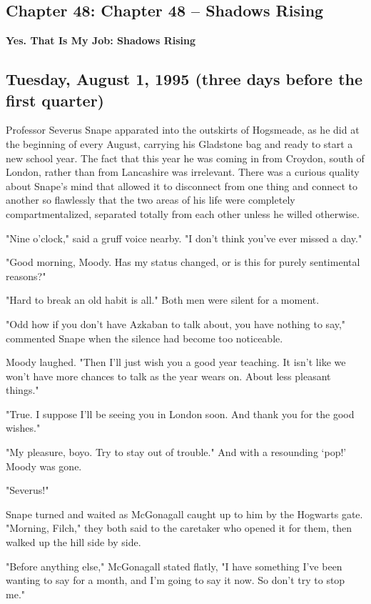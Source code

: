 \documentclass[a4paper,11pt]{article}
\begin{document}
\subsection{Chapter 48: Chapter 48 – Shadows Rising}

\textbf{Yes. That Is My Job: Shadows Rising}

\subsection{Tuesday, August 1, 1995 (three days before the first quarter)}

Professor Severus Snape apparated into the outskirts of Hogsmeade, as he did at the beginning of every August, carrying his Gladstone bag and ready to start a new school year. The fact that this year he was coming in from Croydon, south of London, rather than from Lancashire was irrelevant. There was a curious quality about Snape's mind that allowed it to disconnect from one thing and connect to another so flawlessly that the two areas of his life were completely compartmentalized, separated totally from each other unless he willed otherwise.

"Nine o'clock," said a gruff voice nearby. "I don't think you've ever missed a day."

"Good morning, Moody. Has my status changed, or is this for purely sentimental reasons?"

"Hard to break an old habit is all." Both men were silent for a moment.

"Odd how if you don't have Azkaban to talk about, you have nothing to say," commented Snape when the silence had become too noticeable.

Moody laughed. "Then I'll just wish you a good year teaching. It isn't like we won't have more chances to talk as the year wears on. About less pleasant things."

"True. I suppose I'll be seeing you in London soon. And thank you for the good wishes."

"My pleasure, boyo. Try to stay out of trouble." And with a resounding `pop!' Moody was gone.

"Severus!"

Snape turned and waited as McGonagall caught up to him by the Hogwarts gate. "Morning, Filch," they both said to the caretaker who opened it for them, then walked up the hill side by side.

"Before anything else," McGonagall stated flatly, "I have something I've been wanting to say for a month, and I'm going to say it now. So don't try to stop me."
\end{document}
